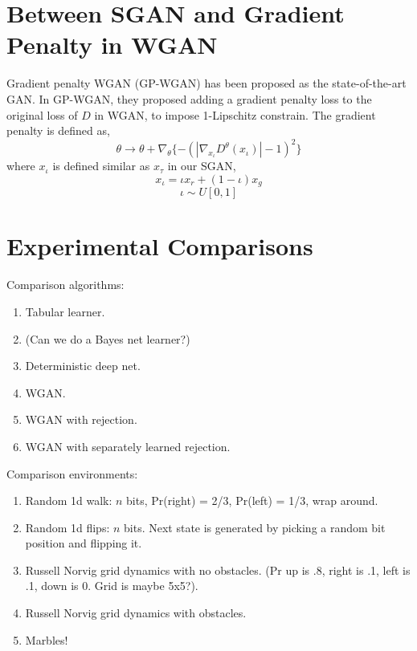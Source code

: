 \documentclass[letterpaper]{article} %
\begin{document}
\section{Between SGAN and Gradient Penalty in WGAN}

Gradient penalty WGAN (GP-WGAN) has been proposed as the state-of-the-art GAN. In GP-WGAN, they proposed adding a gradient penalty loss to the original loss of $D$ in WGAN, to impose 1-Lipschitz constrain. The gradient penalty is defined as,
\begin{equation}\label{gp-loss}
    \theta \longrightarrow \theta + \nabla_{\theta} \{ - (|\nabla_{x_{\iota}}D^{\theta}(x_{\iota})|-1)^2 \}
\end{equation}
where $x_\iota$ is defined similar as $x_\tau$ in our SGAN,
\begin{equation}\label{x-iota}
  x_{\iota} = \iota x_{r} + (1-\iota) x_g
\end{equation}
\begin{equation}\label{iota}
  \iota \sim U[0,1]
\end{equation}


\section{Experimental Comparisons}

Comparison algorithms:
\begin{enumerate}
\item Tabular learner.
\item (Can we do a Bayes net learner?)
\item Deterministic deep net.
\item WGAN.
\item WGAN with rejection.
\item WGAN with separately learned rejection.
\end{enumerate}

Comparison environments:
\begin{enumerate}
\item Random 1d walk: $n$ bits, Pr(right) = 2/3, Pr(left) = 1/3, wrap around.
\item Random 1d flips: $n$ bits. Next state is generated by picking a random bit position and flipping it.
\item Russell Norvig grid dynamics with no obstacles. (Pr up is .8, right is .1, left is .1, down is 0. Grid is maybe 5x5?).
\item Russell Norvig grid dynamics with obstacles.
\item Marbles!
\end{enumerate}
\end{document}
